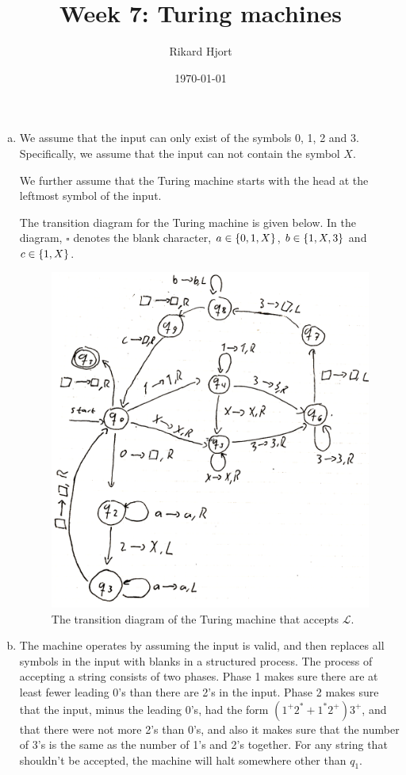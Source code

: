 \documentclass{article}
\title{Week 7: Turing machines}
\date{\today}
\author{Rikard Hjort}
\begin{document}
\maketitle

\begin{enumerate}[(a)]
    \item 
        We assume that the input can only exist of the symbols 0, 1, 2 and 3. Specifically, we assume that the input can not contain the symbol $X$.

        We further assume that the Turing machine starts with the head at the leftmost symbol of the input.

        The transition diagram for the Turing machine is given below. In the diagram, $\square$ denotes the blank character, $a \in \set{0,1,X}$, $b \in \set{1,X,3}$ and $c \in \set{1,X}$.

        \begin{figure}[htpb]
            \centering
            \includegraphics[width=0.75\linewidth]{turing}
            \caption{The transition diagram of the Turing machine that accepts $\mathcal{L}$.}
            \label{fig:turing}
        \end{figure}

        \newpage
    \item

        The machine operates by assuming the input is valid, and then replaces all symbols in the input with blanks in a structured process. The process of accepting a string consists of two phases. Phase 1 makes sure there are at least fewer leading 0's than there are 2's in the input. Phase 2 makes sure that the input, minus the leading 0's, had the form $(1^+2^* + 1^*2^+)3^+$, and that there were not more 2's than 0's, and also it makes sure that the number of 3's is the same as the number of 1's and 2's together. For any string that shouldn't be accepted, the machine will halt somewhere other than $q_1$.


\end{enumerate}
\end{document}

